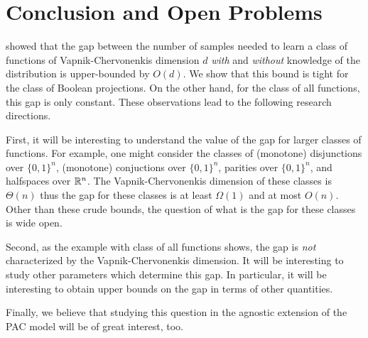 \section{Conclusion and Open Problems}
\label{section:conclusions}

\citet{Darnstadt-Simon-Szorenyi-2013} showed that the gap between the number of
samples needed to learn a class of functions of Vapnik-Chervonenkis dimension
$d$ \emph{with} and \emph{without} knowledge of the distribution is
upper-bounded by $O(d)$. We show that this bound is tight for the class of
Boolean projections. On the other hand, for the class of all functions, this gap
is only constant. These observations lead to the following research directions.

First, it will be interesting to understand the value of the gap for larger
classes of functions. For example, one might consider the classes of (monotone)
disjunctions over $\{0,1\}^n$, (monotone) conjuctions over $\{0,1\}^n$, parities
over $\{0,1\}^n$, and halfspaces over $\mathbb{R}^n$. The Vapnik-Chervonenkis dimension
of these classes is $\Theta(n)$ thus the gap for these classes is at least
$\Omega(1)$ and at most $O(n)$. Other than these crude bounds, the question of
what is the gap for these classes is wide open.

Second, as the example with class of all functions shows, the gap is \emph{not}
characterized by the Vapnik-Chervonenkis dimension. It will be interesting to
study other parameters which determine this gap. In particular, it will be
interesting to obtain upper bounds on the gap in terms of other quantities.

Finally, we believe that studying this question in the agnostic extension of the
PAC model \citep[Chapter~2]{Anthony-Bartlett-1999} will be of great interest,
too.

